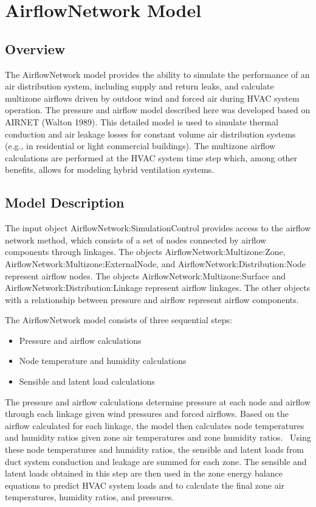 \section{AirflowNetwork Model}\label{airflownetwork-model}

\subsection{Overview}\label{overview-004}

The AirflowNetwork model provides the ability to simulate the performance of an air distribution system, including supply and return leaks, and calculate multizone airflows driven by outdoor wind and forced air during HVAC system operation. The pressure and airflow model described here was developed based on AIRNET (Walton 1989). This detailed model is used to simulate thermal conduction and air leakage losses for constant volume air distribution systems (e.g., in residential or light commercial buildings). The multizone airflow calculations are performed at the HVAC system time step which, among other benefits, allows for modeling hybrid ventilation systems.

\subsection{Model Description}\label{model-description-001}

The input object AirflowNetwork:SimulationControl provides access to the airflow network method, which consists of a set of nodes connected by airflow components through linkages. The objects AirflowNetwork:Multizone:Zone, AirflowNetwork:Multizone:ExternalNode, and AirflowNetwork:Distribution:Node represent airflow nodes. The objects AirflowNetwork:Multizone:Surface and AirflowNetwork:Distribution:Linkage represent airflow linkages. The other objects with a relationship between pressure and airflow represent airflow components.

The AirflowNetwork model consists of three sequential steps:

\begin{itemize}
\item
  Pressure and airflow calculations
\item
  Node temperature and humidity calculations
\item
  Sensible and latent load calculations
\end{itemize}

The pressure and airflow calculations determine pressure at each node and airflow through each linkage given wind pressures and forced airflows. Based on the airflow calculated for each linkage, the model then calculates node temperatures and humidity ratios given zone air temperatures and zone humidity ratios.~ Using these node temperatures and humidity ratios, the sensible and latent loads from duct system conduction and leakage are summed for each zone. The sensible and latent loads obtained in this step are then used in the zone energy balance equations to predict HVAC system loads and to calculate the final zone air temperatures, humidity ratios, and pressures.

